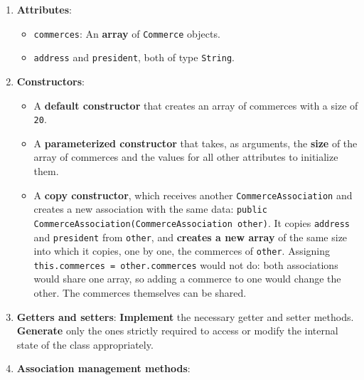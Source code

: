 \begin{enumerate}

    \item \textbf{Attributes}:

        \begin{itemize}

            \item \texttt{commerces}: An \textbf{array} of \texttt{Commerce} objects.

            \item \texttt{address} and \texttt{president}, both of type \texttt{String}.

        \end{itemize}

    \item \textbf{Constructors}:

        \begin{itemize}

            \item A \textbf{default constructor} that creates an array of commerces with a size of \texttt{20}.

            \item A \textbf{parameterized constructor} that takes, as arguments, the \textbf{size} of the array of commerces and the values for all other attributes to initialize them.

            \item A \textbf{copy constructor}, which receives another \texttt{CommerceAssociation} and creates a new association with the same data: \texttt{public CommerceAssociation(CommerceAssociation other)}. It copies \texttt{address} and \texttt{president} from \texttt{other}, and \textbf{creates a new array} of the same size into which it copies, one by one, the commerces of \texttt{other}. Assigning \texttt{this.commerces = other.commerces} would not do: both associations would share one array, so adding a commerce to one would change the other. The commerces themselves can be shared.

        \end{itemize}

    \item \textbf{Getters and setters}: \textbf{Implement} the necessary getter and setter methods. \textbf{Generate} only the ones strictly required to access or modify the internal state of the class appropriately.

    \item \textbf{Association management methods}:


\end{enumerate}
